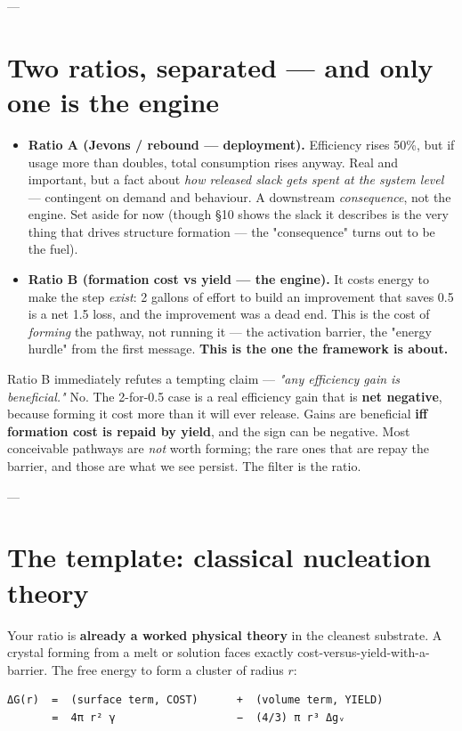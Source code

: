 \documentclass{article}
\begin{document}
---

\section{Two ratios, separated --- and only one is the engine}

\begin{itemize}
    \item \textbf{Ratio A (Jevons / rebound --- deployment).} Efficiency rises 50\%, but if usage more than doubles, total consumption rises anyway. Real and important, but a fact about \textit{how released slack gets spent at the system level} --- contingent on demand and behaviour. A downstream \textit{consequence}, not the engine. Set aside for now (though §10 shows the slack it describes is the very thing that drives structure formation --- the "consequence" turns out to be the fuel).

    \item \textbf{Ratio B (formation cost vs yield --- the engine).} It costs energy to make the step \textit{exist}: 2 gallons of effort to build an improvement that saves 0.5 is a net 1.5 loss, and the improvement was a dead end. This is the cost of \textit{forming} the pathway, not running it --- the activation barrier, the "energy hurdle" from the first message. \textbf{This is the one the framework is about.}
\end{itemize}

Ratio B immediately refutes a tempting claim --- \textit{"any efficiency gain is beneficial."} No. The 2-for-0.5 case is a real efficiency gain that is \textbf{net negative}, because forming it cost more than it will ever release. Gains are beneficial \textbf{iff formation cost is repaid by yield}, and the sign can be negative. Most conceivable pathways are \textit{not} worth forming; the rare ones that are repay the barrier, and those are what we see persist. The filter is the ratio.

---

\section{The template: classical nucleation theory}
Your ratio is \textbf{already a worked physical theory} in the cleanest substrate. A crystal forming from a melt or solution faces exactly cost-versus-yield-with-a-barrier. The free energy to form a cluster of radius $r$:

\begin{verbatim}
ΔG(r)  =  (surface term, COST)      +  (volume term, YIELD)
       =  4π r² γ                   −  (4/3) π r³ Δgᵥ
\end{verbatim}
\end{document}

